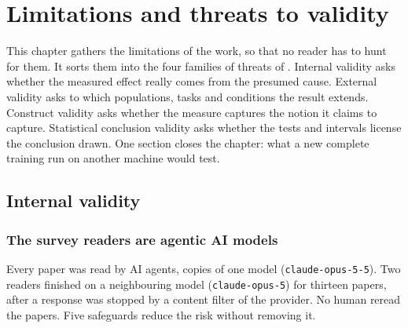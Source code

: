 \chapter{Limitations and threats to validity}
\label{chap:10-limites}

This chapter gathers the limitations of the work, so that no reader has to hunt for them. It sorts
them into the four families of threats of \textcite{shadish2002experimental}. Internal validity asks
whether the measured effect really comes from the presumed cause. External validity asks to which
populations, tasks and conditions the result extends. Construct validity asks whether the measure
captures the notion it claims to capture. Statistical conclusion validity asks whether the tests and
intervals license the conclusion drawn. One section closes the chapter: what a new complete
training run on another machine would test.

\section{Internal validity}
\label{sec:val-interne}

\subsection{The survey readers are agentic AI models}

Every paper was read by AI agents, copies of one model (\texttt{claude-opus-5-5}). Two
readers finished on a neighbouring model (\texttt{claude-opus-5}) for thirteen papers, after a
response was stopped by a content filter of the provider. No human reread the papers. Five safeguards reduce the risk without removing it.

